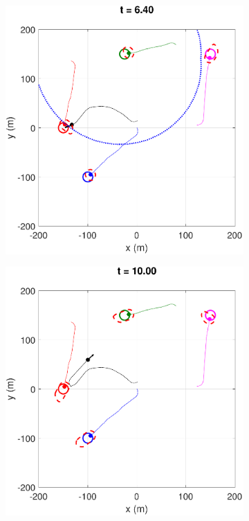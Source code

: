 \begin{figure}
\begin{subfigure}{.5\columnwidth}
  \includegraphics[width=\columnwidth]{figs/simulate_bufferRegion_properties_normal_2}
  \subcaption{}
  \label{fig:normalcase2}
\end{subfigure}
\begin{subfigure}{.5\columnwidth}
  \centering
  \includegraphics[width=\columnwidth]{figs/simulate_bufferRegion_properties_normal_3}

\end{subfigure}
\end{figure}
